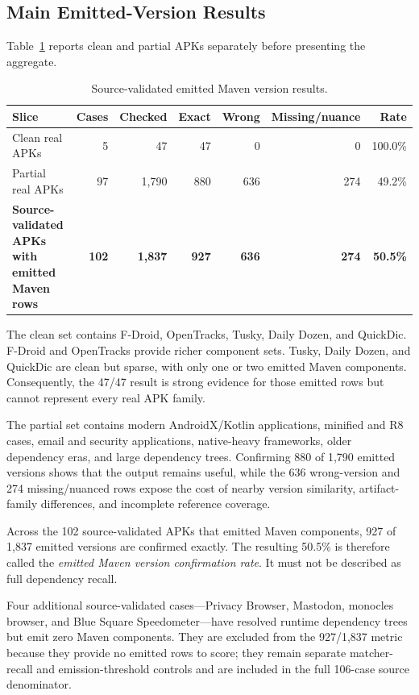 \subsection{Main Emitted-Version Results}

Table~\ref{tab:pfe-main-real-results} reports clean and partial APKs separately
before presenting the aggregate.

\begin{table}[H]
\centering
\caption{Source-validated emitted Maven version results.}
\label{tab:pfe-main-real-results}
\begin{tabularx}{\textwidth}{Xrrrrrr}
\toprule
\textbf{Slice} & \textbf{Cases} & \textbf{Checked} & \textbf{Exact} &
\textbf{Wrong} & \textbf{Missing/nuance} & \textbf{Rate}\\
\midrule
Clean real APKs & 5 & 47 & 47 & 0 & 0 & 100.0\%\\
Partial real APKs & 97 & 1,790 & 880 & 636 & 274 & 49.2\%\\
\midrule
\textbf{Source-validated APKs with emitted Maven rows} & \textbf{102} &
\textbf{1,837} &
\textbf{927} & \textbf{636} & \textbf{274} & \textbf{50.5\%}\\
\bottomrule
\end{tabularx}
\end{table}

The clean set contains F-Droid, OpenTracks, Tusky, Daily Dozen, and QuickDic.
F-Droid and OpenTracks provide richer component sets. Tusky, Daily Dozen, and
QuickDic are clean but sparse, with only one or two emitted Maven components.
Consequently, the 47/47 result is strong evidence for those emitted rows but
cannot represent every real APK family.

The partial set contains modern AndroidX/Kotlin applications, minified and R8
cases, email and security applications, native-heavy frameworks, older
dependency eras, and large dependency trees. Confirming 880 of 1,790 emitted
versions shows that the output remains useful, while the 636 wrong-version and
274 missing/nuanced rows expose the cost of nearby version similarity,
artifact-family differences, and incomplete reference coverage.

Across the 102 source-validated APKs that emitted Maven components, 927 of
1,837 emitted versions are confirmed exactly. The resulting 50.5\% is
therefore called the \emph{emitted Maven version confirmation rate}. It must
not be described as full dependency recall.

Four additional source-validated cases---Privacy Browser, Mastodon, monocles
browser, and Blue Square Speedometer---have resolved runtime dependency trees
but emit zero Maven components. They are excluded from the 927/1,837 metric
because they provide no emitted rows to score; they remain separate
matcher-recall and emission-threshold controls and are included in the full
106-case source denominator.

